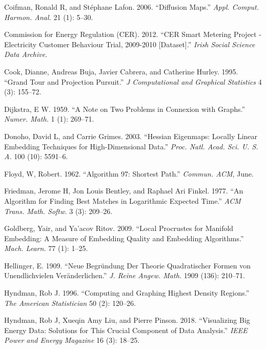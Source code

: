 \documentclass[12pt]{article}
\newlength{\cslhangindent}
\newenvironment{cslreferences}%
  {\setlength{\parindent}{0pt}%
  \everypar{\setlength{\hangindent}{\cslhangindent}}\ignorespaces}%
  {\par}
\begin{document}
\begin{cslreferences}
\leavevmode\hypertarget{ref-Coifman2006-no}{}%
Coifman, Ronald R, and Stéphane Lafon. 2006. ``Diffusion Maps.'' \emph{Appl. Comput. Harmon. Anal.} 21 (1): 5--30.

\leavevmode\hypertarget{ref-cer2012-data}{}%
Commission for Energy Regulation (CER). 2012. ``CER Smart Metering Project - Electricity Customer Behaviour Trial, 2009-2010 {[}Dataset{]}.'' \emph{Irish Social Science Data Archive}.

\leavevmode\hypertarget{ref-Cook1995}{}%
Cook, Dianne, Andreas Buja, Javier Cabrera, and Catherine Hurley. 1995. ``Grand Tour and Projection Pursuit.'' \emph{J Computational and Graphical Statistics} 4 (3): 155--72.

\leavevmode\hypertarget{ref-Dijkstra1959-ml}{}%
Dijkstra, E W. 1959. ``A Note on Two Problems in Connexion with Graphs.'' \emph{Numer. Math.} 1 (1): 269--71.

\leavevmode\hypertarget{ref-Donoho2003-am}{}%
Donoho, David L, and Carrie Grimes. 2003. ``Hessian Eigenmaps: Locally Linear Embedding Techniques for High-Dimensional Data.'' \emph{Proc. Natl. Acad. Sci. U. S. A.} 100 (10): 5591--6.

\leavevmode\hypertarget{ref-FloydRobert1962-au}{}%
Floyd, W, Robert. 1962. ``Algorithm 97: Shortest Path.'' \emph{Commun. ACM}, June.

\leavevmode\hypertarget{ref-Friedman1977-dh}{}%
Friedman, Jerome H, Jon Louis Bentley, and Raphael Ari Finkel. 1977. ``An Algorithm for Finding Best Matches in Logarithmic Expected Time.'' \emph{ACM Trans. Math. Softw.} 3 (3): 209--26.

\leavevmode\hypertarget{ref-Goldberg2009-tb}{}%
Goldberg, Yair, and Ya'acov Ritov. 2009. ``Local Procrustes for Manifold Embedding: A Measure of Embedding Quality and Embedding Algorithms.'' \emph{Mach. Learn.} 77 (1): 1--25.

\leavevmode\hypertarget{ref-Hellinger_undated-rs}{}%
Hellinger, E. 1909. ``Neue Begründung Der Theorie Quadratischer Formen von Unendlichvielen Veränderlichen.'' \emph{J. Reine Angew. Math.} 1909 (136): 210--71.

\leavevmode\hypertarget{ref-HDR96}{}%
Hyndman, Rob J. 1996. ``Computing and Graphing Highest Density Regions.'' \emph{The American Statistician} 50 (2): 120--26.

\leavevmode\hypertarget{ref-Hyndman2018-nq}{}%
Hyndman, Rob J, Xueqin Amy Liu, and Pierre Pinson. 2018. ``Visualizing Big Energy Data: Solutions for This Crucial Component of Data Analysis.'' \emph{IEEE Power and Energy Magazine} 16 (3): 18--25.


\end{cslreferences}
\end{document}
